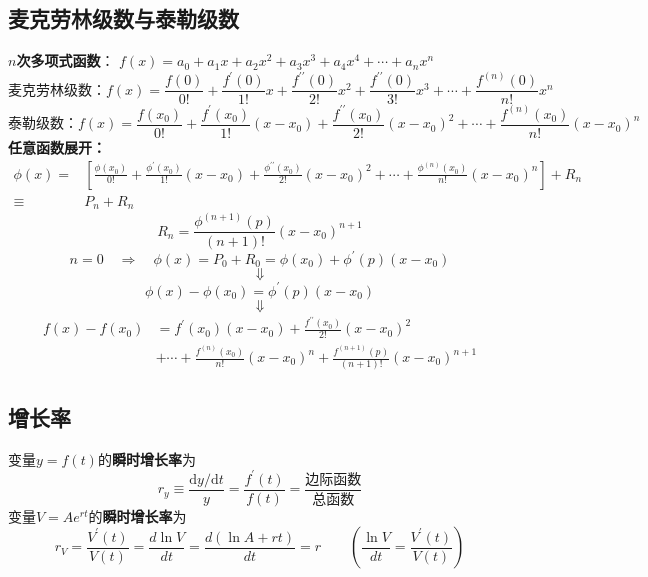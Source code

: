 \documentclass[12pt, a4paper, oneside]{article}
\begin{document}
\begin{CJK*}{UTF8}{gbsn}
\subsection{麦克劳林级数与泰勒级数}
\noindent\textbf{$n$次多项式函数}：
$f(x)=a_{0}+a_{1} x+a_{2} x^{2}+a_{3} x^{3}+a_{4} x^{4}+\cdots+a_{n} x^{n}$
$$
\textbf{麦克劳林级数：}
f(x)=\frac{f(0)}{0 !}
+\frac{f^{\prime}(0)}{1 !} x
+\frac{f^{\prime \prime}(0)}{2 !} x^{2}
+\frac{f^{\prime \prime}(0)}{3 !} x^{3}
+\cdots+\frac{f^{(n)}(0)}{n !} x^{n}
$$
$$
\textbf{泰勒级数：}
f(x)=\frac{f(x_{0})}{0 !}
+\frac{f^{\prime}\left(x_{0}\right)}{1 !}\left(x-x_{0}\right)
+\frac{f^{\prime \prime}\left(x_{0}\right)}{2 !}\left(x-x_{0}\right)^{2}
+\cdots
+\frac{f^{(n)}\left(x_{0}\right)}{n !}\left(x-x_{0}\right)^{n} 
$$
\textbf{任意函数展开：}
$$
\begin{aligned}
	\phi(x)=&
	\left[
	\frac{\phi\left(x_{0}\right)}{0 !}
	+\frac{\phi^{\prime}\left(x_{0}\right)}{1 !}\left(x-x_{0}\right)
	+\frac{\phi^{\prime\prime}\left(x_{0}\right)}{2 !}\left(x-x_{0}\right)^{2}
	+\cdots
	+\frac{\phi^{(n)}\left(x_{0}\right)}{n !}\left(x-x_{0}\right)^{n}
	\right]
	+R_{n} 
	\\ \equiv & P_{n}+R_{n}
\end{aligned}
$$
$$
R_{n}=\frac{\phi^{(n+1)}(p)}{(n+1) !}\left(x-x_{0}\right)^{n+1}
$$
$$
n=0
\quad\Rightarrow\quad
\phi(x)=P_{0}+R_{0}=\phi\left(x_{0}\right)+\phi^{\prime}(p)\left(x-x_{0}\right)
$$
$$
\Downarrow
$$
$$
\phi(x)-\phi\left(x_{0}\right)=\phi^{\prime}(p)\left(x-x_{0}\right)
$$
$$
\Downarrow
$$
$$
\begin{aligned}
f(x)  -f\left(x_{0}\right)&=f^{\prime}\left(x_{0}\right)\left(x-x_{0}\right)+\frac{f^{\prime \prime}\left(x_{0}\right)}{2 !}\left(x-x_{0}\right)^{2} \\
 & +\cdots+\frac{f^{(n)}\left(x_{0}\right)}{n !}\left(x-x_{0}\right)^{n}+\frac{f^{(n+1)}(p)}{(n+1) !}\left(x-x_{0}\right)^{n+1}
\end{aligned}
$$

%
\subsection{增长率}
\noindent
变量$y=f(t)$的\textbf{瞬时增长率}为
$$
r_{y} \equiv \frac{\mathrm{d} y / \mathrm{d} t}{y}=\frac{f^{\prime}(t)}{f(t)}=\frac{\text{边际函数}}{\text{总函数}}
$$
变量$V=Ae^{rt}$的\textbf{瞬时增长率}为
$$
r_{V}=\frac{V^{\prime}(t)}{V(t)}=\frac{d\ln V}{dt}=\frac{d(\ln A+rt)}{dt}=r
\quad\quad(\frac{\ln V}{dt}=\frac{V^{\prime}(t)}{V(t)})
$$


\end{CJK*}
\end{document}
